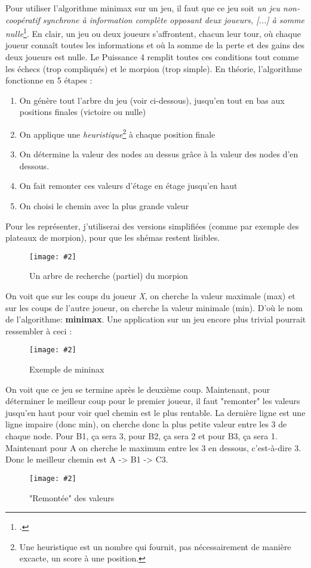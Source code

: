 \documentclass[a4paper]{article}
\newcommand{\img}[3][]{
    \begin{figure}[H]
        \centering
        \texttt{[image: \#2]}
        \caption{#1}    
    \end{figure}
}
\begin{document}
    Pour utiliser l'algorithme minimax sur un jeu, il faut que ce jeu soit \textit{un jeu non-coopératif synchrone à information complète opposant deux joueurs, [...] à somme nulle}\footcite{wiki_minimax_neuman}. En clair, un jeu ou deux joueurs s'affrontent, chacun leur tour, où chaque joueur connaît toutes les informations et où la somme de la perte et des gains des deux joueurs est nulle. Le Puissance 4 remplit toutes ces conditions tout comme les échecs (trop compliqués) et le morpion (trop simple). En théorie, l'algorithme fonctionne en 5 étapes : 
    \begin{enumerate}
        \item On génère tout l'arbre du jeu (voir ci-dessous), jusqu'en tout en bas aux positions finales (victoire ou nulle)
        \item On applique une \textit{heuristique}\footnote{Une heuristique est un nombre qui fournit, pas nécessairement de manière excacte, un score à une position.} à chaque position finale
        \item On détermine la valeur des nodes au dessus grâce à la valeur des nodes d'en dessous.
        \item On fait remonter ces valeurs d'étage en étage jusqu'en haut
        \item On choisi le chemin avec la plus grande valeur
    \end{enumerate}
    Pour les représenter, j'utiliserai des versions simplifiées (comme par exemple des plateaux de morpion), pour que les shémas restent lisibles.

    \img[Un arbre de recherche (partiel) du morpion]{Images/MinimaxShema.png}{0.8}
    
    On voit que sur les coups du joueur \textit{X}, on cherche la valeur maximale (max) et sur les coups de l'autre joueur, on cherche la valeur minimale (min). D'où le nom de l'algorithme: \textbf{minimax}. Une application sur un jeu encore plus trivial pourrait ressembler à ceci :
    \img[Exemple de mininax]{Images/MinimaxShema2.png}{0.75}
    On voit que ce jeu se termine après le deuxième coup. Maintenant, pour déterminer le meilleur coup pour le premier joueur, il faut "remonter" les valeurs jusqu'en haut pour voir quel chemin est le plus rentable. La dernière ligne est une ligne impaire (donc min), on cherche donc la plus petite valeur entre les 3 de chaque node. Pour B1, ça sera 3, pour B2, ça sera 2 et pour B3, ça sera 1. Maintenant pour A on cherche le maximum entre les 3 en dessous, c'est-à-dire 3. Donc le meilleur chemin est A -> B1 -> C3.
    \img["Remontée" des valeurs]{Images/MinimaxShema3.png}{0.6}
\end{document}
